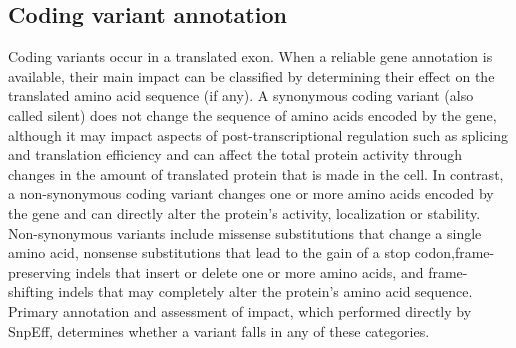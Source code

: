 \subsection{Coding variant annotation}

Coding variants occur in a translated exon. When a reliable gene annotation is available, their main impact can be classified by determining their effect on the translated amino acid sequence (if any). A synonymous coding variant (also called silent) does not change the sequence of amino acids encoded by the gene, although it may impact aspects of post-transcriptional regulation such as splicing and translation efficiency and can affect the total protein activity through changes in the amount of translated protein that is made in the cell. In contrast, a non-synonymous coding variant changes one or more amino acids encoded by the gene and can directly alter the protein’s activity, localization or stability. Non-synonymous variants include missense substitutions that change a single amino acid, nonsense substitutions that lead to the gain of a stop codon,frame-preserving indels that insert or delete one or more amino acids, and frame-shifting indels that may completely alter the protein’s amino acid sequence. Primary annotation and assessment of impact, which performed directly by SnpEff, determines whether a variant falls in any of these categories.

